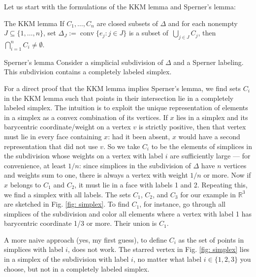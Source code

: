 \documentclass[english, 11pt]{article}
\newcommand{\conv}{\mathop{\mathrm{conv}}}
\theoremstyle{plain} %
\newcommand{\thistheoremname}{}
\newtheorem*{genericthm*}{\thistheoremname}
\newenvironment{namedthm*}[1]
  {\renewcommand{\thistheoremname}{#1}%
   \begin{genericthm*}}
  {\end{genericthm*}}
\begin{document}
Let us start with the formulations of the KKM lemma and Sperner's lemma:

\begin{namedthm*}{The KKM lemma}
If $C_1, \ldots, C_n$ are closed subsets of $\Delta$ and for each nonempty $J \subseteq \{1, \ldots, n\}$, set $\Delta_J := \conv \{e_j: j \in J\}$ is a subset of\, $\bigcup_{j \in J} C_j$, then\, $\bigcap_{i=1}^n C_i \neq \emptyset$.
\end{namedthm*}

\begin{namedthm*}{Sperner's lemma}
Consider a simplicial subdivision of $\Delta$ and a Sperner labeling. This subdivision contains a completely labeled simplex.
\end{namedthm*}

For a direct proof that the KKM lemma implies Sperner's lemma, we find sets $C_i$ in the KKM lemma such that points in their intersection lie in a completely labeled simplex. The intuition is to exploit the unique representation of elements in a simplex as a convex combination of its vertices. If $x$ lies in a simplex and its barycentric coordinate/weight on a vertex $v$ is strictly positive, then that vertex must lie in every face containing $x$: had it been absent, $x$ would have a second representation that did not use $v$. So we take $C_i$ to be the elements of simplices in the subdivision whose weights on a vertex with label $i$ are sufficiently large --- for convenience, at least $1/n$: since simplices in the subdivision of $\Delta$ have $n$ vertices and weights sum to one, there is always a vertex with weight $1/n$ or more. Now if $x$ belongs to $C_1$ and $C_2$, it must lie in a face with labels 1 and 2. Repeating this, we find a simplex with all labels. The sets $C_1$, $C_2$, and $C_3$ for our example in $\mathbb{R}^3$ are sketched in Fig. \ref{fig: simplex}. To find $C_1$, for instance, go through all simplices of the subdivision and color all elements where a vertex with label 1 has barycentric coordinate 1/3 or more. Their union is $C_1$.

A more naive approach (yes, my first guess), to define $C_i$ as the set of points in simplices with label $i$, does not work. The starred vertex in Fig. \ref{fig: simplex} lies in a simplex of the subdivision with label $i$, no matter what label $i \in \{1, 2, 3\}$ you choose, but not in a completely labeled simplex.
\end{document}
